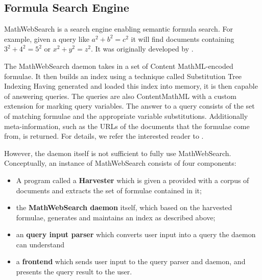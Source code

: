 
\subsection{Formula Search Engine}


MathWebSearch  is a search engine enabling semantic formula search. 
For example, given a query like $a^2 + b^2 = c^2$ it will find documents containing $3^2 + 4^2 = 5^2$ or $x^2 + y^2 = z^2$.
It was originally developed by . 

The MathWebSearch daemon takes in a set of Content MathML-encoded formulae.
It then builds an index using a technique called Substitution Tree Indexing
Having generated and loaded this index into memory, it is then capable of answering queries.
The queries are also ContentMathML with a custom extension for marking query variables.
The answer to a query consists of the set of matching formulae and the appropriate variable substitutions. 
Additionally meta-information, such as the URLs of the documents that the formulae come from, is returned. 
For details, we refer the interested reader to .  

However, the daemon itself is not sufficient to fully use MathWebSearch. 
Conceptually, an instance of MathWebSearch consists of four components:
\begin{itemize}
    \item A program called a \textbf{Harvester} which is given a provided with a corpus of documents and extracts the set of formulae contained in it;
    \item the \textbf{MathWebSearch daemon} itself, which based on the harvested formulae, generates and maintains an index as described above;
    \item an \textbf{query input parser} which converts user input into a query the daemon can understand
    \item a \textbf{frontend} which sends user input to the query parser and daemon, and presents the query result to the user.  
\end{itemize}


